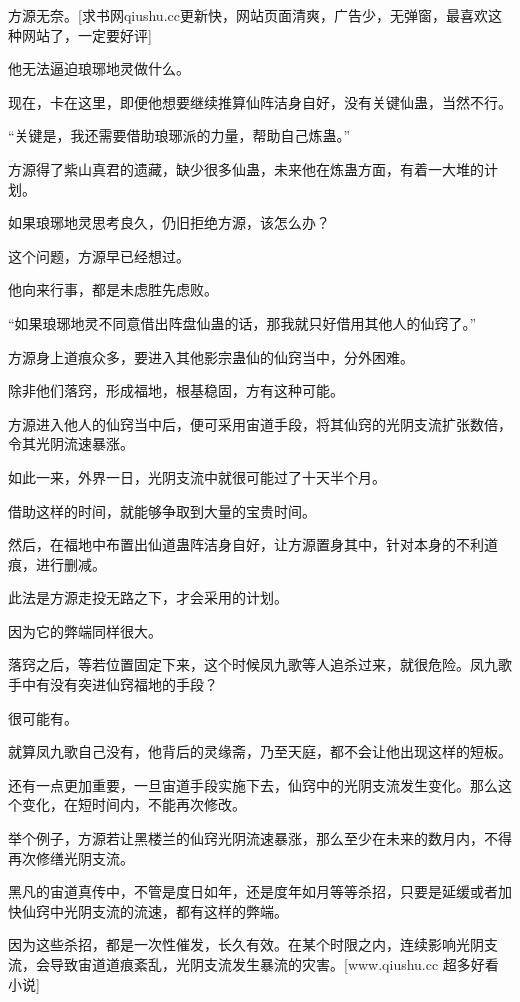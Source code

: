 
\begin{this_body}

方源无奈。[求书网qiushu.cc更新快，网站页面清爽，广告少，无弹窗，最喜欢这种网站了，一定要好评]

他无法逼迫琅琊地灵做什么。

现在，卡在这里，即便他想要继续推算仙阵洁身自好，没有关键仙蛊，当然不行。

“关键是，我还需要借助琅琊派的力量，帮助自己炼蛊。”

方源得了紫山真君的遗藏，缺少很多仙蛊，未来他在炼蛊方面，有着一大堆的计划。

如果琅琊地灵思考良久，仍旧拒绝方源，该怎么办？

这个问题，方源早已经想过。

他向来行事，都是未虑胜先虑败。

“如果琅琊地灵不同意借出阵盘仙蛊的话，那我就只好借用其他人的仙窍了。”

方源身上道痕众多，要进入其他影宗蛊仙的仙窍当中，分外困难。

除非他们落窍，形成福地，根基稳固，方有这种可能。

方源进入他人的仙窍当中后，便可采用宙道手段，将其仙窍的光阴支流扩张数倍，令其光阴流速暴涨。

如此一来，外界一日，光阴支流中就很可能过了十天半个月。

借助这样的时间，就能够争取到大量的宝贵时间。

然后，在福地中布置出仙道蛊阵洁身自好，让方源置身其中，针对本身的不利道痕，进行删减。

此法是方源走投无路之下，才会采用的计划。

因为它的弊端同样很大。

落窍之后，等若位置固定下来，这个时候凤九歌等人追杀过来，就很危险。凤九歌手中有没有突进仙窍福地的手段？

很可能有。

就算凤九歌自己没有，他背后的灵缘斋，乃至天庭，都不会让他出现这样的短板。

还有一点更加重要，一旦宙道手段实施下去，仙窍中的光阴支流发生变化。那么这个变化，在短时间内，不能再次修改。

举个例子，方源若让黑楼兰的仙窍光阴流速暴涨，那么至少在未来的数月内，不得再次修缮光阴支流。

黑凡的宙道真传中，不管是度日如年，还是度年如月等等杀招，只要是延缓或者加快仙窍中光阴支流的流速，都有这样的弊端。

因为这些杀招，都是一次性催发，长久有效。在某个时限之内，连续影响光阴支流，会导致宙道道痕紊乱，光阴支流发生暴流的灾害。[www.qiushu.cc 超多好看小说]


\end{this_body}
